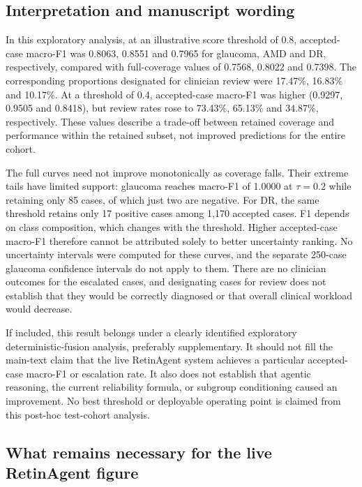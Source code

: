 \subsection*{Interpretation and manuscript wording}

In this exploratory analysis, at an illustrative score threshold of 0.8,
accepted-case macro-F1 was 0.8063, 0.8551 and 0.7965 for glaucoma, AMD and DR,
respectively, compared with full-coverage values of 0.7568, 0.8022 and 0.7398.
The corresponding proportions designated for clinician review were 17.47\%,
16.83\% and 10.17\%. At a threshold of 0.4, accepted-case macro-F1 was higher
(0.9297, 0.9505 and 0.8418), but review rates rose to 73.43\%, 65.13\% and
34.87\%, respectively. These values describe a trade-off between retained
coverage and performance within the retained subset, not improved predictions
for the entire cohort.

The full curves need not improve monotonically as coverage falls. Their
extreme tails have limited support: glaucoma reaches macro-F1 of 1.0000 at
$\tau=0.2$ while retaining only 85 cases, of which just two are negative.
For DR, the same threshold retains only 17 positive cases among 1,170 accepted
cases. F1 depends on class composition, which changes with the threshold.
Higher accepted-case macro-F1 therefore cannot be attributed solely to better
uncertainty ranking. No uncertainty intervals were computed for these curves,
and the separate 250-case glaucoma confidence intervals do not apply to them.
There are no clinician outcomes for the escalated cases, and designating cases
for review does not establish that they would be correctly diagnosed or that
overall clinical workload would decrease.

If included, this result belongs under a clearly identified exploratory
deterministic-fusion analysis, preferably supplementary. It should not fill
the main-text claim that the live RetinAgent system achieves a particular
accepted-case macro-F1 or escalation rate. It also does not establish that
agentic reasoning, the current reliability formula, or subgroup conditioning
caused an improvement. No best threshold or deployable operating point is
claimed from this post-hoc test-cohort analysis.

\subsection*{What remains necessary for the live RetinAgent figure}

